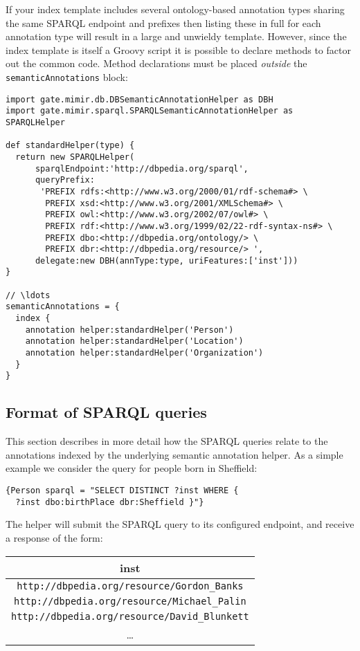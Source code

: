 If your index template includes several ontology-based annotation types sharing
the same SPARQL endpoint and prefixes then listing these in full for each
annotation type will result in a large and unwieldy template.  However, since
the index template is itself a Groovy script it is possible to declare methods
to factor out the common code.  Method declarations must be placed
{\em outside} the {\tt semanticAnnotations} block:
\begin{lstlisting}[texcl, breaklines, breakindent=150pt]
import gate.mimir.db.DBSemanticAnnotationHelper as DBH
import gate.mimir.sparql.SPARQLSemanticAnnotationHelper as SPARQLHelper

def standardHelper(type) {
  return new SPARQLHelper(
      sparqlEndpoint:'http://dbpedia.org/sparql',
      queryPrefix:
       'PREFIX rdfs:<http://www.w3.org/2000/01/rdf-schema#> \
        PREFIX xsd:<http://www.w3.org/2001/XMLSchema#> \
        PREFIX owl:<http://www.w3.org/2002/07/owl#> \
        PREFIX rdf:<http://www.w3.org/1999/02/22-rdf-syntax-ns#> \
        PREFIX dbo:<http://dbpedia.org/ontology/> \
        PREFIX dbr:<http://dbpedia.org/resource/> ',
      delegate:new DBH(annType:type, uriFeatures:['inst']))
}

// \ldots
semanticAnnotations = {
  index {
    annotation helper:standardHelper('Person')
    annotation helper:standardHelper('Location')
    annotation helper:standardHelper('Organization')
  }
}
\end{lstlisting}

\subsection{Format of SPARQL queries}

This section describes in more detail how the SPARQL queries relate to the
annotations indexed by the underlying semantic annotation helper.  As a simple
example we consider the query for people born in Sheffield:
\begin{verbatim}
{Person sparql = "SELECT DISTINCT ?inst WHERE {
  ?inst dbo:birthPlace dbr:Sheffield }"}
\end{verbatim}
%
The helper will submit the SPARQL query to its configured endpoint, and receive
a response of the form:

\begin{tabular}{|c|}
\hline
{\bf inst} \\
\hline
{\tt http://dbpedia.org/resource/Gordon\_Banks} \\
{\tt http://dbpedia.org/resource/Michael\_Palin} \\
{\tt http://dbpedia.org/resource/David\_Blunkett} \\
\ldots \\
\hline
\end{tabular}

